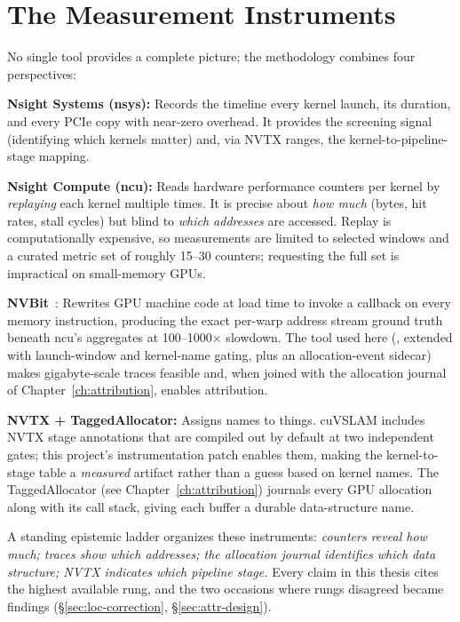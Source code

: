 \section{The Measurement Instruments}\label{sec:bg-tools}

No single tool provides a complete picture; the methodology combines four perspectives:

\textbf{Nsight Systems (nsys):} Records the timeline every kernel launch, its duration, and every PCIe copy with near-zero overhead. It provides the screening signal (identifying which kernels matter) and, via NVTX ranges, the kernel-to-pipeline-stage mapping.

\textbf{Nsight Compute (ncu):} Reads hardware performance counters per kernel by \emph{replaying} each kernel multiple times. It is precise about \emph{how much} (bytes, hit rates, stall cycles) but blind to \emph{which addresses} are accessed. Replay is computationally expensive, so measurements are limited to selected windows and a curated metric set of roughly 15--30 counters; requesting the full set is impractical on small-memory GPUs.

\textbf{NVBit}~\cite{villa2019nvbit}: Rewrites GPU machine code at load time to invoke a callback on every memory instruction, producing the exact per-warp address stream ground truth beneath ncu's aggregates at 100--1000$\times$ slowdown. The tool used here (, extended with launch-window and kernel-name gating, plus an allocation-event sidecar) makes gigabyte-scale traces feasible and, when joined with the allocation journal of Chapter~\ref{ch:attribution}, enables attribution.

\textbf{NVTX + TaggedAllocator:} Assigns names to things. cuVSLAM includes NVTX stage annotations that are compiled out by default at two independent gates; this project's instrumentation patch enables them, making the kernel-to-stage table a \emph{measured} artifact rather than a guess based on kernel names. The TaggedAllocator (see Chapter~\ref{ch:attribution}) journals every GPU allocation along with its call stack, giving each buffer a durable data-structure name.

A standing epistemic ladder organizes these instruments: \emph{counters reveal how much; traces show which addresses; the allocation journal identifies which data structure; NVTX indicates which pipeline stage.} Every claim in this thesis cites the highest available rung, and the two occasions where rungs disagreed became findings (\S\ref{sec:loc-correction}, \S\ref{sec:attr-design}).